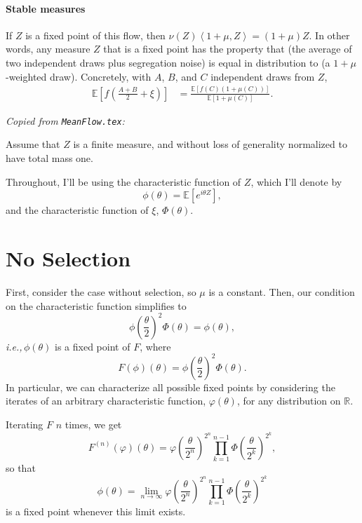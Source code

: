 \documentclass{article}
\newcommand{\E}{\mathbb{E}}
\newcommand{\ip}[2]{\left\langle #1, #2 \right\rangle}
\newcommand{\ie}{\textit{i.e.,}\,}
\newcommand{\comment}[1]{{\color{blue} \it #1}}
\theoremstyle{remark}
\theoremstyle{definition}
\begin{document}
\paragraph{Stable measures}
If $Z$ is a fixed point of this flow,
then $\nu(Z)\ip{1+\mu}{Z} = (1+\mu)Z$.
In other words, any measure $Z$ that is a fixed point has the property that
(the average of two independent draws plus segregation noise)
is equal in distribution to
(a $1+\mu$-weighted draw).
Concretely, with $A$, $B$, and $C$ independent draws from $Z$,
\begin{align} \label{eqn:ABC_condition}
    \E\left[ f\left( \frac{A+B}{2} + \xi \right) \right]
    &=
    \frac{\E\left[ f(C) (1+\mu(C)) \right]}{\E[1+\mu(C)]} .
\end{align}

\comment{Copied from \texttt{MeanFlow.tex}:}

Assume that $Z$ is a finite measure, and without loss of generality normalized to have total mass one.

Throughout, I'll be using the characteristic function of $Z$, which I'll denote by 
\[
	\phi(\theta) = \mathbb{E}\left[e^{i\theta Z}\right],
\]
and the characteristic function of $\xi$, $\Phi(\theta)$.

\section{No Selection}

First, consider the case without selection, so $\mu$ is a constant.  Then, our condition on the characteristic function simplifies to
\begin{equation}\label{CHARACTERISTIC}
	{\textstyle \phi\left(\frac{\theta}{2}\right)^{2}} \Phi(\theta) %
	= \phi(\theta),
\end{equation}
\ie $\phi(\theta)$ is a fixed point of $F$, where
 \[
	F(\phi)(\theta) = {\textstyle \phi\left(\frac{\theta}{2}\right)^{2}} \Phi(\theta).
\]
In particular, we can characterize all possible fixed points by considering the iterates of an arbitrary characteristic function, $\varphi(\theta)$, for  any distribution on $\mathbb{R}$.  

Iterating $F$ $n$ times, we get
\[
	F^{(n)}(\varphi)(\theta)
	=  {\textstyle \varphi\left(\frac{\theta}{2^{n}}\right)^{2^{n}}}\prod_{k=1}^{n-1} {\textstyle \Phi\left(\frac{\theta}{2^{k}}\right)^{2^{k}}},
\]
so that
\[
	\phi(\theta) = \lim_{n \to \infty} \varphi\left(\frac{\theta}{2^{n}}\right)^{2^{n}}\prod_{k=1}^{n-1}\Phi\left(\frac{\theta}{2^{k}}\right)^{2^{k}}
\]
is a fixed point whenever this limit exists.  
\end{document}
